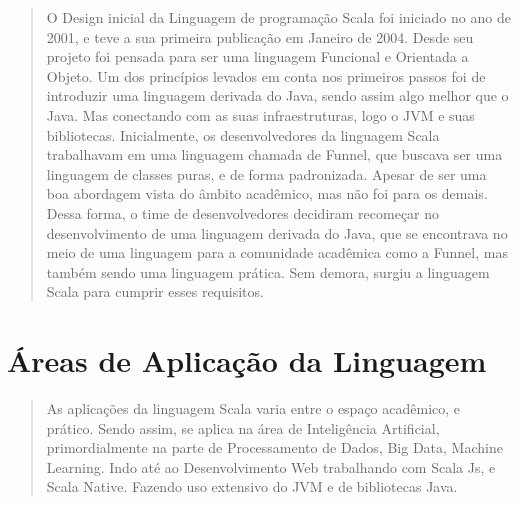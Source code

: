 \begin{quote}
   O Design inicial da Linguagem de programação Scala foi iniciado no ano de 2001, e teve a sua primeira publicação em Janeiro de 2004. Desde seu projeto foi pensada para ser uma linguagem Funcional e Orientada a Objeto.
   Um dos princípios levados em conta nos primeiros passos foi de introduzir uma linguagem derivada do Java, sendo assim algo melhor que o Java. Mas conectando com as suas infraestruturas, logo o JVM e suas bibliotecas.
   Inicialmente, os desenvolvedores da linguagem Scala trabalhavam em uma linguagem chamada de Funnel, que buscava ser uma linguagem de classes puras, e de forma padronizada.
   Apesar de ser uma boa abordagem vista do âmbito acadêmico, mas não foi para os demais.
   Dessa forma, o time de desenvolvedores decidiram recomeçar no desenvolvimento de uma linguagem derivada do Java, que se encontrava no meio de uma linguagem para a comunidade acadêmica como a Funnel, mas também sendo uma linguagem prática. Sem demora, surgiu a linguagem Scala para cumprir esses requisitos.
\end{quote}


\section{\'{A}reas de Aplica\c{c}\~{a}o da Linguagem}
\begin{quote}
   As aplicações da linguagem Scala varia entre o espaço acadêmico, e prático. Sendo assim, se aplica na área de Inteligência Artificial, primordialmente na parte de
   Processamento de Dados, Big Data, Machine Learning. Indo até ao Desenvolvimento Web trabalhando com Scala Js, e Scala Native. Fazendo uso extensivo do JVM e de bibliotecas Java.
\end{quote}
